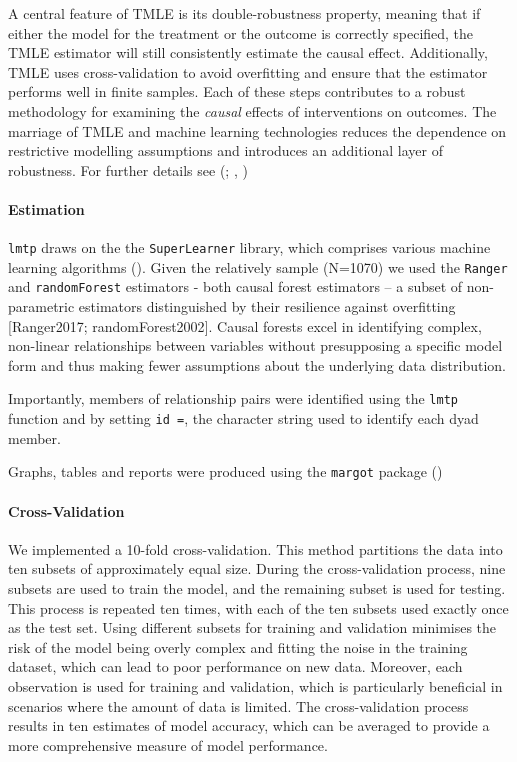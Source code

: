 \documentclass[
  singlecolumn]{article}
\let\oldparagraph\paragraph
\renewcommand{\paragraph}[1]{\oldparagraph{#1}\mbox{}}
\begin{document}
A central feature of TMLE is its double-robustness property, meaning
that if either the model for the treatment or the outcome is correctly
specified, the TMLE estimator will still consistently estimate the
causal effect. Additionally, TMLE uses cross-validation to avoid
overfitting and ensure that the estimator performs well in finite
samples. Each of these steps contributes to a robust methodology for
examining the \emph{causal} effects of interventions on outcomes. The
marriage of TMLE and machine learning technologies reduces the
dependence on restrictive modelling assumptions and introduces an
additional layer of robustness. For further details see
(;
,
)

\paragraph{Estimation}\label{estimation}

\texttt{lmtp} draws on the the \texttt{SuperLearner} library, which
comprises various machine learning algorithms
(). Given the
relatively sample (N=1070) we used the \texttt{Ranger} and
\texttt{randomForest} estimators - both causal forest estimators -- a
subset of non-parametric estimators distinguished by their resilience
against overfitting {[}Ranger2017; randomForest2002{]}. Causal forests
excel in identifying complex, non-linear relationships between variables
without presupposing a specific model form and thus making fewer
assumptions about the underlying data distribution.

Importantly, members of relationship pairs were identified using the
\texttt{lmtp} function and by setting \texttt{id\ =}, the character
string used to identify each dyad member.

Graphs, tables and reports were produced using the \texttt{margot}
package ()

\paragraph{Cross-Validation}\label{cross-validation}

We implemented a 10-fold cross-validation. This method partitions the
data into ten subsets of approximately equal size. During the
cross-validation process, nine subsets are used to train the model, and
the remaining subset is used for testing. This process is repeated ten
times, with each of the ten subsets used exactly once as the test set.
Using different subsets for training and validation minimises the risk
of the model being overly complex and fitting the noise in the training
dataset, which can lead to poor performance on new data. Moreover, each
observation is used for training and validation, which is particularly
beneficial in scenarios where the amount of data is limited. The
cross-validation process results in ten estimates of model accuracy,
which can be averaged to provide a more comprehensive measure of model
performance.
\end{document}
